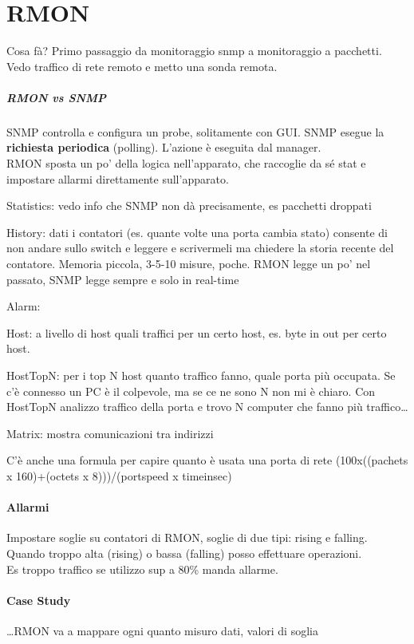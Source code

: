 \documentclass[10pt]{book}
\begin{document}
\section{RMON} Cosa fà? Primo passaggio da monitoraggio snmp a monitoraggio a pacchetti.\\
Vedo traffico di rete remoto e metto una sonda remota.
\subparagraph{RMON vs SNMP} SNMP controlla e configura un probe, solitamente con GUI. SNMP esegue la \textbf{richiesta periodica} (polling). L'azione è eseguita dal manager.\\
RMON sposta un po' della logica nell'apparato, che raccoglie da sé stat e impostare allarmi direttamente sull'apparato.
\begin{list}{}{\textbf{Gruppi RMON}}
	\item Statistics: vedo info che SNMP non dà precisamente, es pacchetti droppati
	\item History: dati i contatori (es. quante volte una porta cambia stato) consente di non andare sullo switch e leggere e scrivermeli ma chiedere la storia recente del contatore. Memoria piccola, 3-5-10 misure, poche. RMON legge un po' nel passato, SNMP legge sempre e solo in real-time
	\item Alarm: 
	\item Host: a livello di host quali traffici per un certo host, es. byte in out per certo host.
	\item HostTopN: per i top N host quanto traffico fanno, quale porta più occupata. Se c'è connesso un PC è il colpevole, ma se ce ne sono N non mi è chiaro. Con HostTopN analizzo traffico della porta e trovo N computer che fanno più traffico\ldots
	\item Matrix: mostra comunicazioni tra indirizzi
\end{list}
C'è anche una formula per capire quanto è usata una porta di rete (100x((pachets x 160)+(octets x 8)))/(portspeed x timeinsec)
\paragraph{Allarmi} Impostare soglie su contatori di RMON, soglie di due tipi: rising e falling. Quando troppo alta (rising) o bassa (falling) posso effettuare operazioni.\\
Es troppo traffico se utilizzo sup a 80\% manda allarme.
\paragraph{Case Study} \ldots RMON va a mappare ogni quanto misuro dati, valori di soglia
\end{document}
